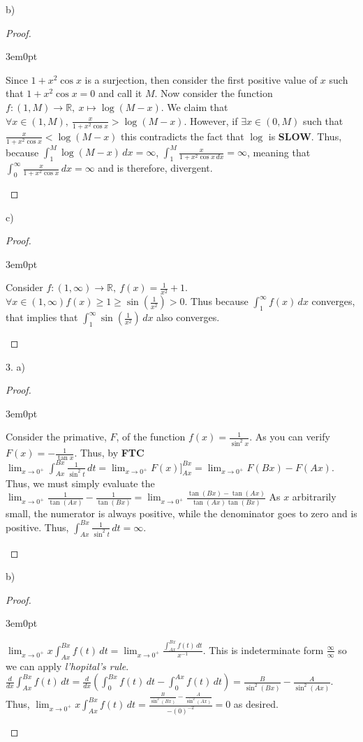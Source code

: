 \documentclass[11pt]{article}
\newcommand{\R}{\mathbb{R}}
\newenvironment{myproof}
{\begin{proof} \begin{adjustwidth}{3em}{0pt}$ $\par\nobreak\ignorespaces}
{\end{adjustwidth} \end{proof}}
\begin{document}
\begin{flushleft}
b)

\begin{myproof}
Since $1+ x^2 \cos x$ is a surjection, then consider the first positive value of $x$ such that $1 + x^2 \cos x =0$ and call it $M$. Now consider the function $f:(1,M) \to \R, \ x \mapsto \log(M-x)$. We claim that $\forall x \in (1,M), \ \frac{x}{1+ x^2 \cos x} > \log (M-x)$. However, if $\exists x \in (0,M)$ such that $\frac{x}{1+ x^2 \cos x} < \log (M-x)$ this contradicts the fact that $\log$ is \textbf{SLOW}.  Thus, because $\int_1^M \log(M-x) \,dx = \infty$, $\int_1^M \frac{x}{1+x^2 \cos x \,dx} = \infty$, meaning that $\int_0^\infty \frac{x}{1+x^2 \cos x} \,dx = \infty$ and is therefore, divergent.
\end{myproof}

c)

\begin{myproof}
Consider $f:(1, \infty) \to \R, \ f(x) = \frac{1}{x^2} + 1$. $\forall x \in (1,\infty) f(x) \geq 1 \geq \sin (\frac{1}{x^2}) > 0$. Thus because $\int_1^\infty f(x) \,dx$ converges, that implies that $\int_1^\infty \sin (\frac{1}{x^2}) \,dx$ also converges.
\end{myproof}

\newpage

3. a)

\begin{myproof}
Consider the primative, $F$, of the function $f(x) = \frac{1}{\sin^2 x}$. As you can verify $F(x) = - \frac{1}{\tan x}$. Thus, by \textbf{FTC} $\lim_{x \to 0^+} \int_{Ax}^{Bx} \frac{1}{\sin^2 t} \,dt = \lim_{x \to 0^+} F(x)]_{Ax}^{Bx} = \lim_{x \to 0^+} F(Bx) - F(Ax)$. Thus, we must simply evaluate the $\lim_{x \to 0^+} \frac{1}{\tan (Ax)} - \frac{1}{\tan (Bx)} = \lim_{x \to 0^+} \frac{\tan (Bx) - \tan (Ax)}{\tan (Ax) \tan (Bx)}$ As $x$ arbitrarily small, the numerator is always positive, while the denominator goes to zero and is positive. Thus, $\int_{Ax}^{Bx} \frac{1}{\sin^2 t} \,dt = \infty$.
\end{myproof}

b)

\begin{myproof}
$\lim_{x \to 0^+} x \int_{Ax}^{Bx} f(t) \,dt = \lim_{x \to 0^+} \frac{\int_{Ax}^{Bx} f(t) \,dt}{x^{-1}}$. This is indeterminate form $\frac{\infty}{\infty}$ so we can apply \textit{l'hopital's rule}. $\frac{d}{dx} \int_{Ax}^{Bx} f(t) \,dt = \frac{d}{dx} (\int_{0}^{Bx} f(t) \,dt - \int_{0}^{Ax} f(t) \,dt) = \frac{B}{ \sin^2 (Bx)} - \frac{A}{ \sin^2 (Ax)}$. Thus, $\lim_{x \to 0^+} x \int_{Ax}^{Bx} f(t) \,dt = \frac{ \frac{B}{ \sin^2 (Bx)} - \frac{A}{ \sin^2 (Ax)}}{-(0)^{-2}} = 0$ as desired.
\end{myproof}


\end{flushleft}
\end{document}
